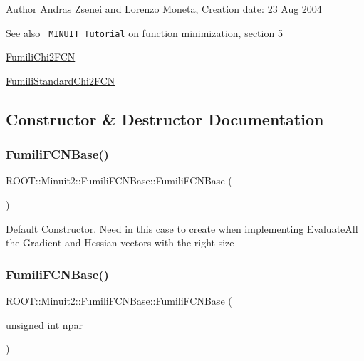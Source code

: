 \begin{DoxyAuthor}{Author}
Andras Zsenei and Lorenzo Moneta, Creation date\+: 23 Aug 2004
\end{DoxyAuthor}
\begin{DoxySeeAlso}{See also}
\href{http://www.cern.ch/winkler/minuit/tutorial/mntutorial.pdf}{\texttt{ M\+I\+N\+U\+IT Tutorial}} on function minimization, section 5

\mbox{\hyperlink{classROOT_1_1Minuit2_1_1FumiliChi2FCN}{Fumili\+Chi2\+F\+CN}}

\mbox{\hyperlink{classROOT_1_1Minuit2_1_1FumiliStandardChi2FCN}{Fumili\+Standard\+Chi2\+F\+CN}} 
\end{DoxySeeAlso}


\subsection{Constructor \& Destructor Documentation}
\mbox{\label{classROOT_1_1Minuit2_1_1FumiliFCNBase_a118a4f34ec003713b719671842f5c6a2}} 
\subsubsection{\texorpdfstring{FumiliFCNBase()}{FumiliFCNBase()}\hspace{0.1cm}{\footnotesize\ttfamily [1/4]}}
{\footnotesize\ttfamily R\+O\+O\+T\+::\+Minuit2\+::\+Fumili\+F\+C\+N\+Base\+::\+Fumili\+F\+C\+N\+Base (\begin{DoxyParamCaption}{ }\end{DoxyParamCaption})\hspace{0.3cm}{\ttfamily [inline]}}

Default Constructor. Need in this case to create when implementing Evaluate\+All the Gradient and Hessian vectors with the right size \mbox{\label{classROOT_1_1Minuit2_1_1FumiliFCNBase_ad20bc861c81429cd75a0b14d5449f066}} 
\subsubsection{\texorpdfstring{FumiliFCNBase()}{FumiliFCNBase()}\hspace{0.1cm}{\footnotesize\ttfamily [2/4]}}
{\footnotesize\ttfamily R\+O\+O\+T\+::\+Minuit2\+::\+Fumili\+F\+C\+N\+Base\+::\+Fumili\+F\+C\+N\+Base (\begin{DoxyParamCaption}\item[{unsigned int}]{npar }\end{DoxyParamCaption})\hspace{0.3cm}{\ttfamily [inline]}}

